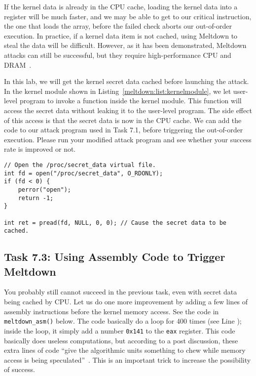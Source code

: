 If the kernel data is already in the CPU cache, loading the kernel data into a 
register will be much faster, and we may be able to get to our critical 
instruction, the one that loads the array, before the failed check 
aborts our out-of-order execution. In practice, if a kernel data item is not cached, using 
Meltdown to steal the  data will be difficult. However, as it has been 
demonstrated, Meltdown attacks can still be successful, but  
they require high-performance CPU and DRAM~\cite{meltdowdemo}. 


In this lab, we will get the kernel secret data cached before launching the attack. 
In the kernel module shown in Listing~\ref{meltdown:list:kernelmodule}, we let user-level
program to invoke a function inside the kernel module. This function will access the secret
data without leaking it to the user-level program. The side effect of this access is that the
secret data is now in the CPU cache. We can add the  
code to our attack program used in Task 7.1, before triggering the out-of-order execution.
Please run your modified attack program and see whether your success rate is improved or not.


\begin{lstlisting}
// Open the /proc/secret_data virtual file.
int fd = open("/proc/secret_data", O_RDONLY);
if (fd < 0) {
    perror("open");
    return -1;
}

int ret = pread(fd, NULL, 0, 0); // Cause the secret data to be cached.
\end{lstlisting}



\subsection{Task 7.3: Using Assembly Code to Trigger Meltdown}

You probably still cannot succeed in the previous task, even with secret data being 
cached by CPU. Let us do one more improvement by adding a few lines of
assembly instructions before the kernel memory access. See the code in
\texttt{meltdown\_asm()} below.  The code 
basically do a loop for 400 times (see Line ); inside the loop,
it simply add a number \texttt{0x141} to the \texttt{eax} register.  
This code basically does useless computations, but 
according to a post discussion, these extra lines of code
``give the algorithmic units something to chew while
memory access is being speculated''~\cite{boldin}. 
This is an important trick to increase the possibility of success. 


